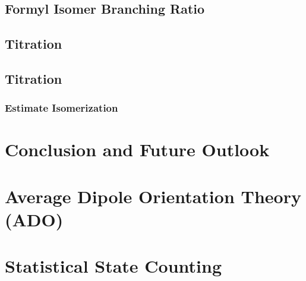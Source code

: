 \documentclass [PhD,nolistoftables,scheader] {uclathes}
\begin{document}
\chapter{}
	\section{Formyl Isomer Branching Ratio}
	

	\section{ Titration}
	

	\section{ Titration}
	
	
		\subsection{Estimate Isomerization}
		

\chapter{Conclusion and Future Outlook}
	

\appendix
	
	\chapter{Average Dipole Orientation Theory (ADO)}
	

	\chapter{Statistical State Counting}
	




\end{document}
